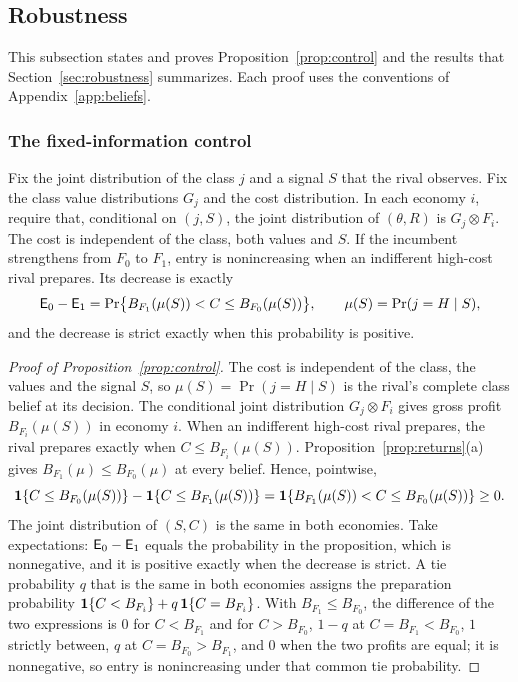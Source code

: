 \subsection{Robustness}\label{app:robustness}

This subsection states and proves Proposition~\ref{prop:control} and the results that Section~\ref{sec:robustness}
summarizes. Each proof uses the conventions of Appendix~\ref{app:beliefs}.

\subsubsection*{The fixed-information control}

\begin{proposition}\label{prop:control}
Fix the joint distribution of the class \(j\) and a signal \(S\) that the rival observes.
Fix the class value distributions \(G_j\) and the cost distribution. In each economy \(i\), require that, conditional on \((j,S)\), the joint distribution of \((\theta,R)\) is \(G_j\otimes F_i\). The cost is independent of the class, both values and \(S\). If
the incumbent strengthens from \(F_0\) to \(F_1\), entry is nonincreasing when an indifferent high-cost rival prepares. Its decrease is exactly
\[
\mathsf{E}_0-\mathsf{E}_1=\Pr\bigl\{B_{F_1}(\mu(S))<C\le B_{F_0}(\mu(S))\bigr\},\qquad \mu(S)=\Pr(j=H\mid S),
\]
and the decrease is strict exactly when this probability is positive.
\end{proposition}

\begin{proof}[Proof of Proposition~\ref{prop:control}]
The cost is independent of the class, the values and the signal \(S\), so \(\mu(S)=\Pr(j=H\mid S)\) is the
rival's complete class belief at its decision. The conditional joint distribution \(G_j\otimes F_i\) gives gross profit \(B_{F_i}(\mu(S))\) in economy \(i\).
When an indifferent high-cost rival prepares, the rival prepares exactly when
\(C\le B_{F_i}(\mu(S))\). Proposition~\ref{prop:returns}(a) gives \(B_{F_1}(\mu)\le B_{F_0}(\mu)\) at every belief.
Hence, pointwise,
\[
\mathbf{1}\{C\le B_{F_0}(\mu(S))\}-\mathbf{1}\{C\le B_{F_1}(\mu(S))\}=\mathbf{1}\{B_{F_1}(\mu(S))<C\le B_{F_0}(\mu(S))\}\ge0 .
\]
The joint distribution of \((S,C)\) is the same in both economies. Take expectations: \(\mathsf{E}_0-\mathsf{E}_1\) equals the
probability in the proposition, which is nonnegative, and it is positive exactly when the decrease is strict. A
tie probability \(q\) that is the same in both economies assigns the preparation probability
\(\mathbf{1}\{C<B_{F_i}\}+q\,\mathbf{1}\{C=B_{F_i}\}\). With \(B_{F_1}\le B_{F_0}\), the difference of the two expressions is \(0\) for
\(C<B_{F_1}\) and for \(C>B_{F_0}\), \(1-q\) at \(C=B_{F_1}<B_{F_0}\), \(1\) strictly between, \(q\) at \(C=B_{F_0}>B_{F_1}\),
and \(0\) when the two profits are equal; it is nonnegative, so entry is nonincreasing under that common tie probability.
\end{proof}

